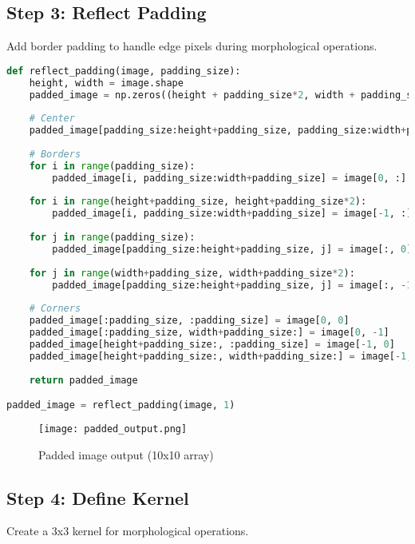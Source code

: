 \documentclass[12pt]{article}
\begin{document}
\subsection{Step 3: Reflect Padding}
Add border padding to handle edge pixels during morphological operations.

\begin{lstlisting}[language=Python]
def reflect_padding(image, padding_size):
    height, width = image.shape
    padded_image = np.zeros((height + padding_size*2, width + padding_size*2), dtype=image.dtype)
    
    # Center
    padded_image[padding_size:height+padding_size, padding_size:width+padding_size] = image
    
    # Borders
    for i in range(padding_size):
        padded_image[i, padding_size:width+padding_size] = image[0, :]
    
    for i in range(height+padding_size, height+padding_size*2):
        padded_image[i, padding_size:width+padding_size] = image[-1, :]
    
    for j in range(padding_size):
        padded_image[padding_size:height+padding_size, j] = image[:, 0]
    
    for j in range(width+padding_size, width+padding_size*2):
        padded_image[padding_size:height+padding_size, j] = image[:, -1]
    
    # Corners
    padded_image[:padding_size, :padding_size] = image[0, 0]
    padded_image[:padding_size, width+padding_size:] = image[0, -1]
    padded_image[height+padding_size:, :padding_size] = image[-1, 0]
    padded_image[height+padding_size:, width+padding_size:] = image[-1, -1]
    
    return padded_image

padded_image = reflect_padding(image, 1)
\end{lstlisting}

\begin{figure}[H]
    \centering
    \texttt{[image: padded\_output.png]}
    \caption{Padded image output (10x10 array)}
    \label{fig:padded}
\end{figure}

\subsection{Step 4: Define Kernel}
Create a 3x3 kernel for morphological operations.
\end{document}
